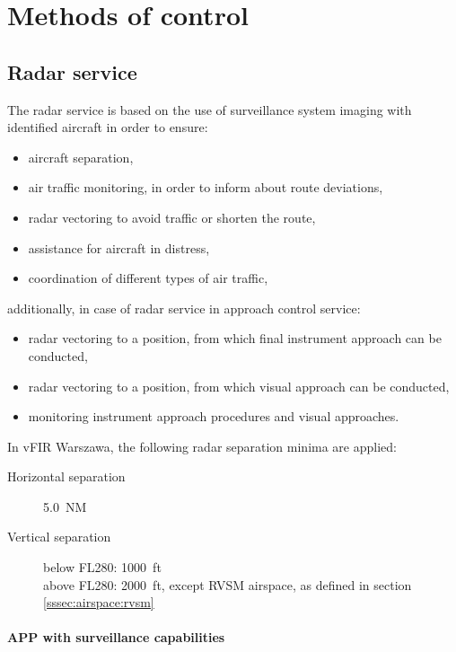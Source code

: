 \chapter{Methods of control}

\section{Radar service}

The radar service is based on the use of surveillance system imaging with
identified aircraft in order to ensure:

\begin{itemize}
\item aircraft separation,
\item air traffic monitoring, in order to inform about route deviations,
\item radar vectoring to avoid traffic or shorten the route,
\item assistance for aircraft in distress,
\item coordination of different types of air traffic,
\end{itemize} additionally, in case of radar service in approach control
service:
\begin{itemize}
\item radar vectoring to a position, from which final instrument approach can be
conducted,
\item radar vectoring to a position, from which visual approach can be
conducted,
\item monitoring instrument approach procedures and visual approaches.
\end{itemize}

In vFIR Warszawa, the following radar separation minima are applied:

\begin{description}
\item[Horizontal separation] 5.0~NM
\item[Vertical separation]\parbox[t]{0.8\textwidth}{ below FL280: 1000~ft\\
above FL280: 2000~ft, except RVSM airspace, as defined in section
\ref{sssec:airspace:rvsm}}
\end{description}

\subsubsection{APP with surveillance capabilities}

